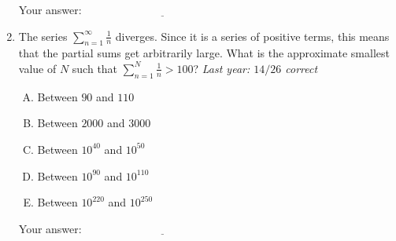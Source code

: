 \documentclass[10pt]{amsart}
\begin{document}
\begin{enumerate}
  \vspace{0.1in}
  Your answer: $\underline{\qquad\qquad\qquad\qquad\qquad\qquad\qquad}$
  \vspace{0.15in}

\item The series $\sum_{n=1}^\infty \frac{1}{n}$ diverges. Since it is
  a series of positive terms, this means that the partial sums get
  arbitrarily large. What is the approximate smallest value of $N$
  such that $\sum_{n=1}^N \frac{1}{n} > 100$? {\em Last year: $14/26$
  correct}
  \begin{enumerate}[(A)]
  \item Between $90$ and $110$
  \item Between $2000$ and $3000$
  \item Between $10^{40}$ and $10^{50}$
  \item Between $10^{90}$ and $10^{110}$
  \item Between $10^{220}$ and $10^{250}$
  \end{enumerate}

  \vspace{0.1in}
  Your answer: $\underline{\qquad\qquad\qquad\qquad\qquad\qquad\qquad}$
  \vspace{0.15in}

\end{enumerate}
\end{document}
